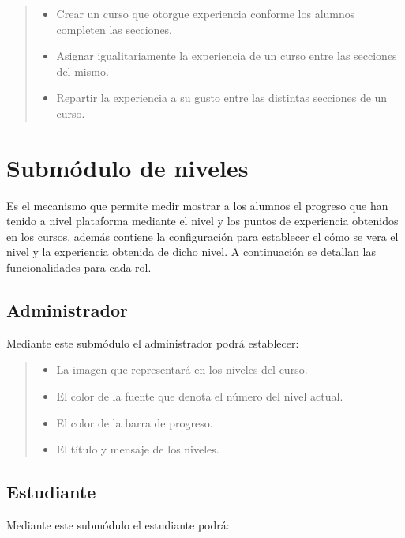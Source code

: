     \begin{quote}
    \begin{itemize}
        \item Crear un curso que otorgue experiencia conforme los alumnos completen las secciones.
        \item Asignar igualitariamente la experiencia de un curso entre las secciones del mismo.
        \item Repartir la experiencia a su gusto entre las distintas secciones de un curso.
    \end{itemize}
    \end{quote}


\section{Submódulo de niveles}

Es el mecanismo que permite medir mostrar a los alumnos el progreso que han tenido a nivel plataforma mediante el nivel y los puntos de experiencia obtenidos en los cursos, además contiene la configuración para establecer el cómo se vera el nivel y la experiencia obtenida de dicho nivel. A continuación se detallan las funcionalidades para cada rol. %

\subsection*{Administrador}
\noindent Mediante este submódulo el administrador podrá establecer:

    \begin{quote}
    \begin{itemize}
        \item La imagen que representará en los niveles del curso.
        \item El color de la fuente que denota el número del nivel actual.
        \item El color de la barra de progreso.
        \item El título y mensaje de los niveles.
    \end{itemize}
    \end{quote}

\subsection*{Estudiante}
\noindent Mediante este submódulo el estudiante podrá:

